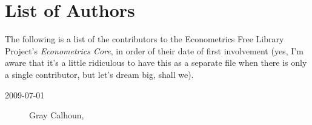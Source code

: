 

\part*{List of Authors}%

The following is a list of the contributors to the Econometrics Free
Library Project's \textit{Econometrics Core}, in order of their date
of first involvement (yes, I'm aware that it's a little ridiculous to
have this as a separate file when there is only a single contributor,
but let's dream big, shall we).

\begin{description}
\item[2009-07-01] Gray Calhoun, 
\end{description}